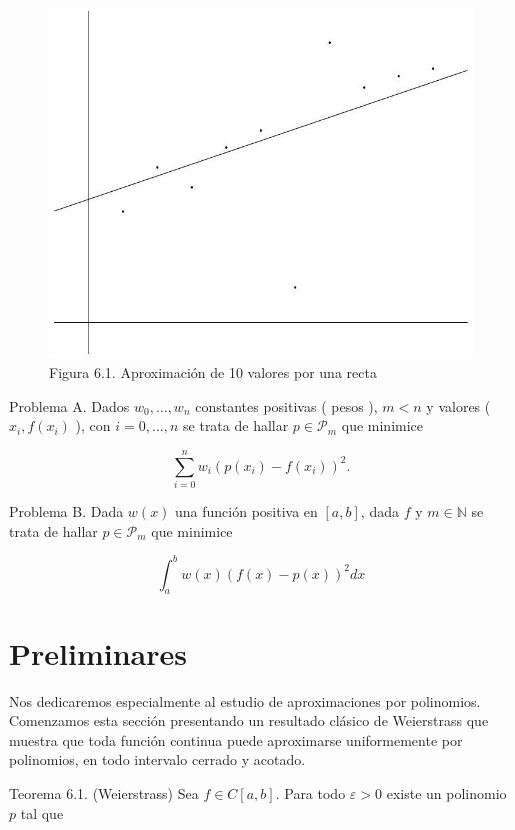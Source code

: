 \documentclass[10pt]{book}
\begin{document}
\begin{figure}[h]
\begin{center}
  \includegraphics[width=\textwidth]{2025_09_05_3888c9ac96bd653d96b4g-118}
\captionsetup{labelformat=empty}
\caption{Figura 6.1. Aproximación de 10 valores por una recta}
\end{center}
\end{figure}

Problema A. Dados $w_{0}, \ldots, w_{n}$ constantes positivas ( pesos ), $m<n$ y valores ( $x_{i}, f\left(x_{i}\right)$ ), con $i=0, \ldots, n$ se trata de hallar $p \in \mathcal{P}_{m}$ que minimice

$$
\sum_{i=0}^{n} w_{i}\left(p\left(x_{i}\right)-f\left(x_{i}\right)\right)^{2} .
$$

Problema B. Dada $w(x)$ una función positiva en $[a, b]$, dada $f$ y $m \in \mathbb{N}$ se trata de hallar $p \in \mathcal{P}_{m}$ que minimice

$$
\int_{a}^{b} w(x)(f(x)-p(x))^{2} d x
$$

\section{Preliminares}
Nos dedicaremos especialmente al estudio de aproximaciones por polinomios. Comenzamos esta sección presentando un resultado clásico de Weierstrass que muestra que toda función continua puede aproximarse uniformemente por polinomios, en todo intervalo cerrado y acotado.

Teorema 6.1. (Weierstrass) Sea $f \in C[a, b]$. Para todo $\varepsilon>0$ existe un polinomio $p$ tal que
\end{document}

